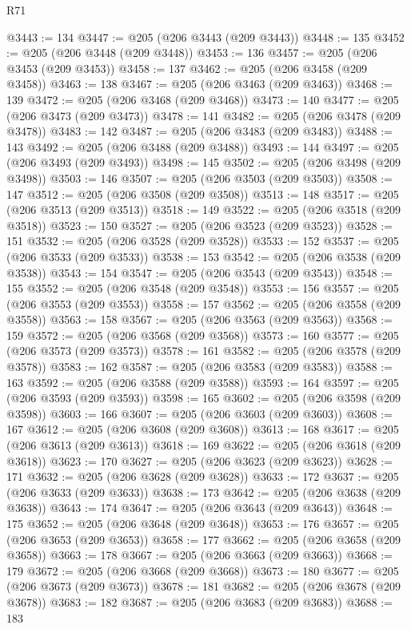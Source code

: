 \begin{lexlean}{R71}
\begin{coremodule}
@3443 := 134
@3447 := @205 (@206 @3443 (@209 @3443))
@3448 := 135
@3452 := @205 (@206 @3448 (@209 @3448))
@3453 := 136
@3457 := @205 (@206 @3453 (@209 @3453))
@3458 := 137
@3462 := @205 (@206 @3458 (@209 @3458))
@3463 := 138
@3467 := @205 (@206 @3463 (@209 @3463))
@3468 := 139
@3472 := @205 (@206 @3468 (@209 @3468))
@3473 := 140
@3477 := @205 (@206 @3473 (@209 @3473))
@3478 := 141
@3482 := @205 (@206 @3478 (@209 @3478))
@3483 := 142
@3487 := @205 (@206 @3483 (@209 @3483))
@3488 := 143
@3492 := @205 (@206 @3488 (@209 @3488))
@3493 := 144
@3497 := @205 (@206 @3493 (@209 @3493))
@3498 := 145
@3502 := @205 (@206 @3498 (@209 @3498))
@3503 := 146
@3507 := @205 (@206 @3503 (@209 @3503))
@3508 := 147
@3512 := @205 (@206 @3508 (@209 @3508))
@3513 := 148
@3517 := @205 (@206 @3513 (@209 @3513))
@3518 := 149
@3522 := @205 (@206 @3518 (@209 @3518))
@3523 := 150
@3527 := @205 (@206 @3523 (@209 @3523))
@3528 := 151
@3532 := @205 (@206 @3528 (@209 @3528))
@3533 := 152
@3537 := @205 (@206 @3533 (@209 @3533))
@3538 := 153
@3542 := @205 (@206 @3538 (@209 @3538))
@3543 := 154
@3547 := @205 (@206 @3543 (@209 @3543))
@3548 := 155
@3552 := @205 (@206 @3548 (@209 @3548))
@3553 := 156
@3557 := @205 (@206 @3553 (@209 @3553))
@3558 := 157
@3562 := @205 (@206 @3558 (@209 @3558))
@3563 := 158
@3567 := @205 (@206 @3563 (@209 @3563))
@3568 := 159
@3572 := @205 (@206 @3568 (@209 @3568))
@3573 := 160
@3577 := @205 (@206 @3573 (@209 @3573))
@3578 := 161
@3582 := @205 (@206 @3578 (@209 @3578))
@3583 := 162
@3587 := @205 (@206 @3583 (@209 @3583))
@3588 := 163
@3592 := @205 (@206 @3588 (@209 @3588))
@3593 := 164
@3597 := @205 (@206 @3593 (@209 @3593))
@3598 := 165
@3602 := @205 (@206 @3598 (@209 @3598))
@3603 := 166
@3607 := @205 (@206 @3603 (@209 @3603))
@3608 := 167
@3612 := @205 (@206 @3608 (@209 @3608))
@3613 := 168
@3617 := @205 (@206 @3613 (@209 @3613))
@3618 := 169
@3622 := @205 (@206 @3618 (@209 @3618))
@3623 := 170
@3627 := @205 (@206 @3623 (@209 @3623))
@3628 := 171
@3632 := @205 (@206 @3628 (@209 @3628))
@3633 := 172
@3637 := @205 (@206 @3633 (@209 @3633))
@3638 := 173
@3642 := @205 (@206 @3638 (@209 @3638))
@3643 := 174
@3647 := @205 (@206 @3643 (@209 @3643))
@3648 := 175
@3652 := @205 (@206 @3648 (@209 @3648))
@3653 := 176
@3657 := @205 (@206 @3653 (@209 @3653))
@3658 := 177
@3662 := @205 (@206 @3658 (@209 @3658))
@3663 := 178
@3667 := @205 (@206 @3663 (@209 @3663))
@3668 := 179
@3672 := @205 (@206 @3668 (@209 @3668))
@3673 := 180
@3677 := @205 (@206 @3673 (@209 @3673))
@3678 := 181
@3682 := @205 (@206 @3678 (@209 @3678))
@3683 := 182
@3687 := @205 (@206 @3683 (@209 @3683))
@3688 := 183

\end{coremodule}
\end{lexlean}
